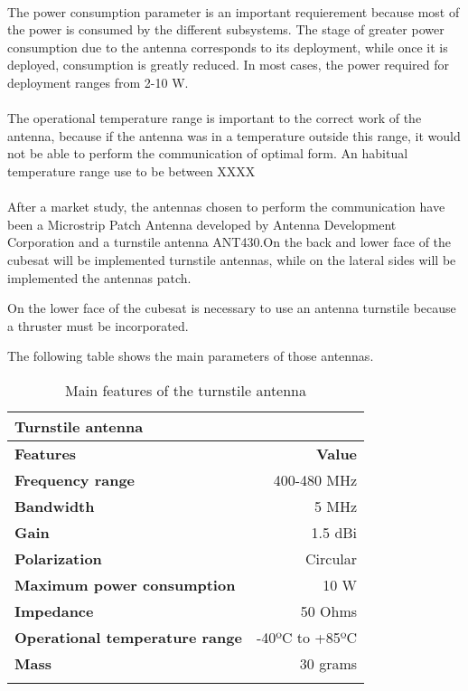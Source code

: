 \paragraph{} 
The power consumption parameter is an important requierement because most of the power is consumed by the different subsystems. The stage of greater power consumption due to the antenna corresponds to its deployment, while once it is deployed, consumption is greatly reduced. In most cases, the power required for deployment ranges from 2-10 W. 

\paragraph{}
The operational temperature range is important to the correct work of the antenna, because if the antenna was in a temperature outside this range, it would not be able to perform the communication of optimal form. An habitual temperature range use to be between XXXX

\paragraph{}
After a market study, the antennas chosen to perform the communication have been a Microstrip Patch Antenna developed by Antenna Development Corporation and a turnstile antenna ANT430.On the back and lower face of the cubesat will be implemented turnstile antennas, while on the lateral sides will be implemented the antennas patch. 

On the lower face of the cubesat is necessary to use an antenna turnstile because a thruster must be incorporated. 

The following table shows the main parameters of those antennas.


\begin{longtable}{| l | r |}

\hline
\rowcolor[gray]{0.60}	\textbf{Turnstile antenna} \\
\hline

\hline
\rowcolor[gray]{0.75}	\textbf{Features} &  \textbf{Value}   \\
\hline

\cellcolor[gray]{0.85} \textbf{Frequency range} & 400-480 MHz  \\
\cellcolor[gray]{0.85} \textbf{Bandwidth} & 5 MHz \\
\cellcolor[gray]{0.85} \textbf{Gain} & 1.5 dBi \\
\cellcolor[gray]{0.85} \textbf{Polarization} & Circular \\
\cellcolor[gray]{0.85} \textbf{Maximum power consumption} & 10 W \\
\cellcolor[gray]{0.85} \textbf{Impedance} & 50 Ohms \\
\cellcolor[gray]{0.85} \textbf{Operational temperature range} & -40ºC to +85ºC \\
\cellcolor[gray]{0.85} \textbf{Mass} & 30 grams \\
\hline

	\caption{Main features of the turnstile antenna}
	\label{turnstileantenna}

\end{longtable}


